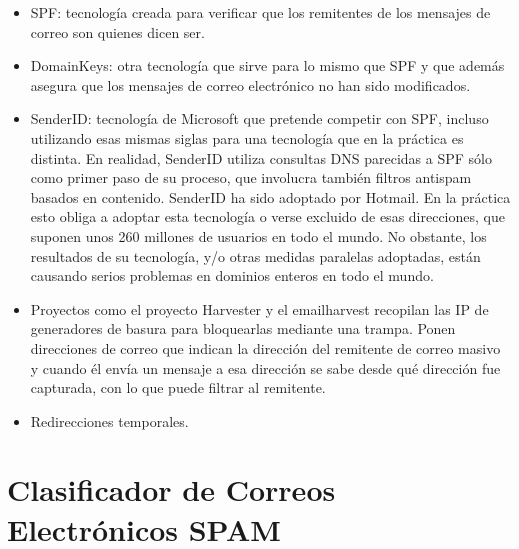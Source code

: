 \documentclass{article}
\begin{document}
\begin{enumerate}
\begin{itemize}
   \item SPF: tecnología creada para verificar que los remitentes de los mensajes de correo son quienes dicen ser.
   \item DomainKeys: otra tecnología que sirve para lo mismo que SPF y que además asegura que los mensajes de correo electrónico no han sido modificados.
   \item SenderID: tecnología de Microsoft que pretende competir con SPF, incluso utilizando esas mismas siglas para una tecnología que en la práctica es distinta. En realidad, SenderID utiliza consultas DNS parecidas a SPF sólo como primer paso de su proceso, que involucra también filtros antispam basados en contenido. SenderID ha sido adoptado por Hotmail. En la práctica esto obliga a adoptar esta tecnología o verse excluido de esas direcciones, que suponen unos 260 millones de usuarios en todo el mundo. No obstante, los resultados de su tecnología, y/o otras medidas paralelas adoptadas, están causando serios problemas en dominios enteros en todo el mundo.
   \item Proyectos como el proyecto Harvester y el emailharvest recopilan las IP de generadores de basura para bloquearlas mediante una trampa. Ponen direcciones de correo que indican la dirección del remitente de correo masivo y cuando él envía un mensaje a esa dirección se sabe desde qué dirección fue capturada, con lo que puede filtrar al remitente.
   \item Redirecciones temporales.
\end{itemize}

\end{enumerate}

\section{Clasificador de Correos Electrónicos SPAM}
\end{document}
